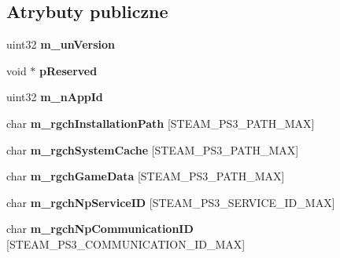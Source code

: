 \subsection*{Atrybuty publiczne}
\begin{DoxyCompactItemize}
\item 
\mbox{\label{struct_steam_p_s3_params__t_a15a6d4166ce90eb0a89d2546ed312cfb}} 
uint32 {\bfseries m\+\_\+un\+Version}
\item 
\mbox{\label{struct_steam_p_s3_params__t_a2d53ce486deae5e375a875c7f0877e34}} 
void $\ast$ {\bfseries p\+Reserved}
\item 
\mbox{\label{struct_steam_p_s3_params__t_a3f4110f89eb639d80fa3aeb3eb7738b8}} 
uint32 {\bfseries m\+\_\+n\+App\+Id}
\item 
\mbox{\label{struct_steam_p_s3_params__t_a51b57ab78e10283c2d06e23da228943f}} 
char {\bfseries m\+\_\+rgch\+Installation\+Path} \mbox{[}S\+T\+E\+A\+M\+\_\+\+P\+S3\+\_\+\+P\+A\+T\+H\+\_\+\+M\+AX\mbox{]}
\item 
\mbox{\label{struct_steam_p_s3_params__t_aa1181e13d76363a2ecc54d1f2c3fbc5c}} 
char {\bfseries m\+\_\+rgch\+System\+Cache} \mbox{[}S\+T\+E\+A\+M\+\_\+\+P\+S3\+\_\+\+P\+A\+T\+H\+\_\+\+M\+AX\mbox{]}
\item 
\mbox{\label{struct_steam_p_s3_params__t_ad5cb897cb73e58157f45399c7283711b}} 
char {\bfseries m\+\_\+rgch\+Game\+Data} \mbox{[}S\+T\+E\+A\+M\+\_\+\+P\+S3\+\_\+\+P\+A\+T\+H\+\_\+\+M\+AX\mbox{]}
\item 
\mbox{\label{struct_steam_p_s3_params__t_ad24d2672a57be2e3657f1e779a146538}} 
char {\bfseries m\+\_\+rgch\+Np\+Service\+ID} \mbox{[}S\+T\+E\+A\+M\+\_\+\+P\+S3\+\_\+\+S\+E\+R\+V\+I\+C\+E\+\_\+\+I\+D\+\_\+\+M\+AX\mbox{]}
\item 
\mbox{\label{struct_steam_p_s3_params__t_a3b2258d9055e84fca373b0675f8caffa}} 
char {\bfseries m\+\_\+rgch\+Np\+Communication\+ID} \mbox{[}S\+T\+E\+A\+M\+\_\+\+P\+S3\+\_\+\+C\+O\+M\+M\+U\+N\+I\+C\+A\+T\+I\+O\+N\+\_\+\+I\+D\+\_\+\+M\+AX\mbox{]}

\end{DoxyCompactItemize}
